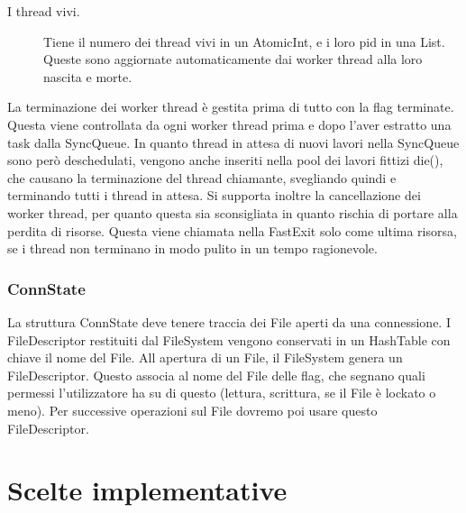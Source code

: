 \documentclass[11pt]{article}
\begin{document}
\begin{flushleft}
\begin{description}
\item[I thread vivi.] Tiene il numero dei thread vivi in un AtomicInt, e i loro pid in una List. Queste sono aggiornate automaticamente dai worker thread alla loro nascita e morte.

\end{description}

La terminazione dei worker thread è gestita prima di tutto con la flag terminate. Questa viene controllata da ogni worker thread prima e dopo l'aver estratto una task dalla SyncQueue. In quanto thread in attesa di nuovi lavori nella SyncQueue sono però deschedulati, vengono anche inseriti nella pool dei lavori fittizi die(), che causano la terminazione del thread chiamante, svegliando quindi e terminando tutti i thread in attesa.
Si supporta inoltre la cancellazione dei worker thread, per quanto questa sia sconsigliata in quanto rischia di portare alla perdita di risorse. Questa viene chiamata nella FastExit solo come ultima risorsa, se i thread non terminano in modo pulito in un tempo ragionevole.

\subsubsection{ConnState}

La struttura ConnState deve tenere traccia dei File aperti da una connessione. I FileDescriptor restituiti dal FileSystem vengono conservati in un HashTable con chiave il nome del File.
All apertura  di un File, il FileSystem genera un FileDescriptor. Questo associa al nome del File delle flag, che segnano quali permessi l'utilizzatore ha su di questo (lettura, scrittura, se il File è lockato o meno). Per successive operazioni sul File dovremo poi usare questo FileDescriptor.

\section{Scelte implementative}

\end{flushleft}
\end{document}
